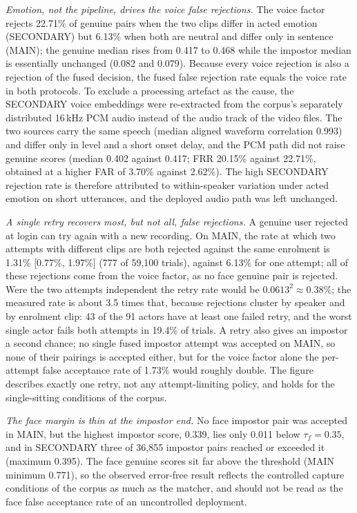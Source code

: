 \documentclass[10pt,journal,compsoc]{IEEEtran}
\begin{document}
{\emph{Emotion, not the pipeline, drives the voice false rejections.} The voice factor rejects 22.71\% of genuine pairs when the two clips differ in acted emotion (SECONDARY) but 6.13\% when both are neutral and differ only in sentence (MAIN); the genuine median rises from 0.417 to 0.468 while the impostor median is essentially unchanged (0.082 and 0.079). Because every voice rejection is also a rejection of the fused decision, the fused false rejection rate equals the voice rate in both protocols. To exclude a processing artefact as the cause, the SECONDARY voice embeddings were re-extracted from the corpus's separately distributed 16\,kHz PCM audio instead of the audio track of the video files. The two sources carry the same speech (median aligned waveform correlation 0.993) and differ only in level and a short onset delay, and the PCM path did not raise genuine scores (median 0.402 against 0.417; FRR 20.15\% against 22.71\%, obtained at a higher FAR of 3.70\% against 2.62\%). The high SECONDARY rejection rate is therefore attributed to within-speaker variation under acted emotion on short utterances, and the deployed audio path was left unchanged.

\emph{A single retry recovers most, but not all, false rejections.} A genuine user rejected at login can try again with a new recording. On MAIN, the rate at which two attempts with different clips are both rejected against the same enrolment is 1.31\% [0.77\%, 1.97\%] (777 of 59{,}100 trials), against 6.13\% for one attempt; all of these rejections come from the voice factor, as no face genuine pair is rejected. Were the two attempts independent the retry rate would be $0.0613^2\approx0.38\%$; the measured rate is about 3.5 times that, because rejections cluster by speaker and by enrolment clip: 43 of the 91 actors have at least one failed retry, and the worst single actor fails both attempts in 19.4\% of trials. A retry also gives an impostor a second chance; no single fused impostor attempt was accepted on MAIN, so none of their pairings is accepted either, but for the voice factor alone the per-attempt false acceptance rate of 1.73\% would roughly double. The figure describes exactly one retry, not any attempt-limiting policy, and holds for the single-sitting conditions of the corpus.

\emph{The face margin is thin at the impostor end.} No face impostor pair was accepted in MAIN, but the highest impostor score, 0.339, lies only 0.011 below $\tau_f=0.35$, and in SECONDARY three of 36{,}855 impostor pairs reached or exceeded it (maximum 0.395). The face genuine scores sit far above the threshold (MAIN minimum 0.771), so the observed error-free result reflects the controlled capture conditions of the corpus as much as the matcher, and should not be read as the face false acceptance rate of an uncontrolled deployment.
}
\end{document}
